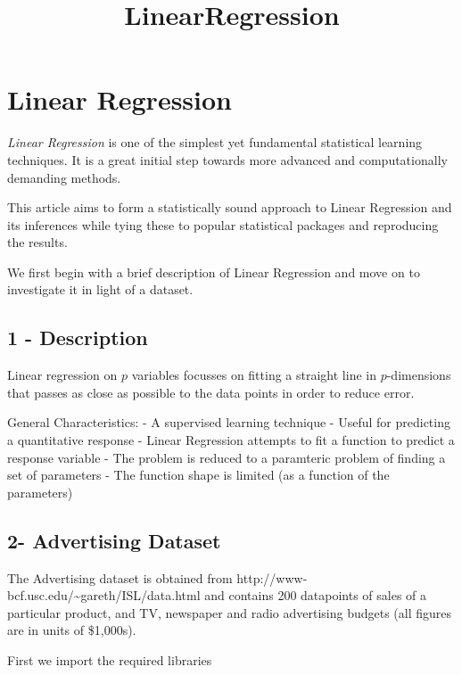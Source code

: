 \documentclass[11pt]{article}
\title{LinearRegression}
\begin{document}
    
    
    \maketitle
    
    

    
    \section{Linear Regression}\label{linear-regression}

\emph{Linear Regression} is one of the simplest yet fundamental
statistical learning techniques. It is a great initial step towards more
advanced and computationally demanding methods.

This article aims to form a statistically sound approach to Linear
Regression and its inferences while tying these to popular statistical
packages and reproducing the results.

We first begin with a brief description of Linear Regression and move on
to investigate it in light of a dataset.

    \subsection{1 - Description}\label{description}

Linear regression on \(p\) variables focusses on fitting a straight line
in \(p\)-dimensions that passes as close as possible to the data points
in order to reduce error.

General Characteristics: - A supervised learning technique - Useful for
predicting a quantitative response - Linear Regression attempts to fit a
function to predict a response variable - The problem is reduced to a
paramteric problem of finding a set of parameters - The function shape
is limited (as a function of the parameters)

    \subsection{2- Advertising Dataset}\label{advertising-dataset}

The Advertising dataset is obtained from
http://www-bcf.usc.edu/\textasciitilde{}gareth/ISL/data.html and
contains 200 datapoints of sales of a particular product, and TV,
newspaper and radio advertising budgets (all figures are in units of
\$1,000s).

First we import the required libraries
\end{document}
